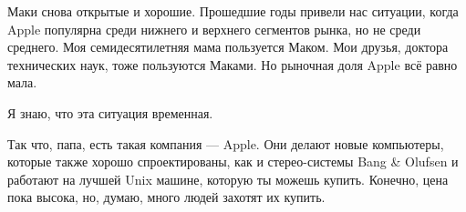 \documentclass[ebook,12pt,oneside,openany]{memoir}
\begin{document}
Маки снова открытые и хорошие. Прошедшие годы привели нас ситуации,
когда Apple популярна среди нижнего и верхнего сегментов рынка, но не
среди среднего. Моя семидесятилетняя мама пользуется Маком. Мои
друзья, доктора технических наук, тоже пользуются Маками. Но рыночная
доля Apple всё равно мала.

Я знаю, что эта ситуация временная.

Так что, папа, есть такая компания — Apple. Они делают новые
компьютеры, которые также хорошо спроектированы, как и стерео-системы
Bang \& Olufsen и работают на лучшей Unix машине, которую ты можешь
купить. Конечно, цена пока высока, но, думаю, много людей захотят их
купить.
\end{document}
